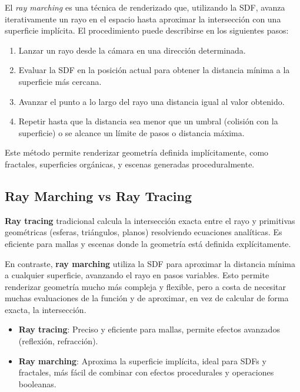 El \textit{ray marching} es una técnica de renderizado que, utilizando la SDF,
avanza iterativamente un rayo en el espacio hasta aproximar la intersección con
una superficie implícita. El procedimiento puede describirse en los siguientes
pasos:

\begin{enumerate}
    \item Lanzar un rayo desde la cámara en una dirección determinada.
    \item Evaluar la SDF en la posición actual para obtener la distancia mínima a la
          superficie más cercana.
    \item Avanzar el punto a lo largo del rayo una distancia igual al valor obtenido.
    \item Repetir hasta que la distancia sea menor que un umbral (colisión con la
          superficie) o se alcance un límite de pasos o distancia máxima.
\end{enumerate}

Este método permite renderizar geometría definida implícitamente, como
fractales, superficies orgánicas, y escenas generadas proceduralmente.

\subsection{Ray Marching vs Ray Tracing}

\textbf{Ray tracing} tradicional calcula la intersección exacta entre el rayo y primitivas geométricas (esferas, triángulos, planos) resolviendo ecuaciones analíticas. Es eficiente para mallas y escenas donde la geometría está definida explícitamente.

En contraste, \textbf{ray marching} utiliza la SDF para aproximar la distancia
mínima a cualquier superficie, avanzando el rayo en pasos variables. Esto
permite renderizar geometría mucho más compleja y flexible, pero a costa de
necesitar muchas evaluaciones de la función y de aproximar, en vez de calcular
de forma exacta, la intersección.

\begin{itemize}
    \item \textbf{Ray tracing}: Preciso y eficiente para mallas, permite efectos avanzados (reflexión, refracción).
    \item \textbf{Ray marching}: Aproxima la superficie implícita, ideal para SDFs y fractales, más fácil de combinar con efectos procedurales y operaciones booleanas.
\end{itemize}

